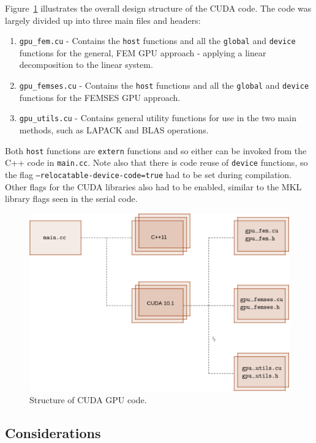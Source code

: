 Figure~\ref{fig:cuda} illustrates the overall design structure of the CUDA code. The code was largely divided up into three main files and headers:
\begin{enumerate}
	\item \texttt{gpu\_fem.cu} - Contains the \texttt{\twound host\twound} functions and all the \texttt{\twound global\twound} and \texttt{\twound device\twound} functions for the general, FEM GPU approach - applying a linear decomposition to the linear system.
	\item \texttt{gpu\_femses.cu} - Contains the \texttt{\twound host\twound} functions and all the \texttt{\twound global\twound} and \texttt{\twound device\twound} functions for the FEMSES GPU approach.
	\item \texttt{gpu\_utils.cu} - Contains general utility functions for use in the two main methods, such as LAPACK and BLAS operations.
\end{enumerate}
Both \texttt{\twound host\twound} functions are \texttt{extern} functions and so either can be invoked from the C++ code in \texttt{main.cc}. Note also that there is code reuse of \texttt{\twound device\twound} functions, so the flag \texttt{--relocatable-device-code=true} had to be set during compilation. Other flags for the CUDA libraries also had to be enabled, similar to the MKL library flags seen in the serial code.
\begin{figure}
	\centering
	\includegraphics[width = 0.7\linewidth]{Figures/cuda_code}
	\caption{Structure of CUDA GPU code.}
	\label{fig:cuda}
\end{figure}

\subsection{Considerations}

